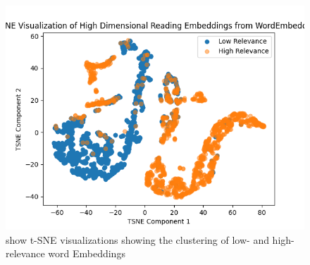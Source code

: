 \documentclass[11pt]{article}
\begin{document}
\begin{figure}[htbp]
\centering
\includegraphics[width=.9\linewidth]{../Figures/Word_embeddings3.png}
\caption{show t-SNE visualizations showing the clustering of low- and high-relevance word  Embeddings}
\end{figure}
\end{document}
